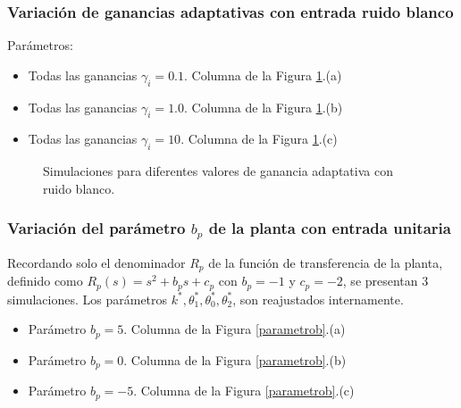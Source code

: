 \documentclass[letterpaper,11pt]{article} %
\begin{document}
\subsubsection{Variación de ganancias adaptativas con entrada ruido blanco}
Parámetros:
\begin{itemize}
	\item Todas las ganancias $\gamma_i = 0.1$. Columna de la Figura \ref{gananciasruido}.(a)
	\item Todas las ganancias $\gamma_i = 1.0$. Columna de la Figura \ref{gananciasruido}.(b)
	\item Todas las ganancias $\gamma_i = 10$. Columna de la Figura \ref{gananciasruido}.(c)
\end{itemize}
\newpage
\begin{figure}[h]
	\centering
	\captionsetup{justification=centering}
	\newline
	\noindent
	\newline
	\noindent
	\addtocounter{figure}{-1}  
	\caption{Simulaciones para diferentes valores de ganancia adaptativa con ruido blanco.}
	\label{gananciasruido}
\end{figure}
\subsubsection{Variación del parámetro $b_p$ de la planta con entrada unitaria}
Recordando solo el denominador $R_p$ de la función de transferencia de la planta, definido como $R_p(s) = s^2 + b_ps + c_p$ con $b_p=-1$ y $c_p = -2$, se presentan 3 simulaciones. Los parámetros $k^*, \theta_1^*, \theta_0^*, \theta_2^*$, son reajustados internamente.
\begin{itemize}
	\item Parámetro $b_p = 5$. Columna de la Figura \ref{parametrob}.(a)
	\item Parámetro $b_p = 0$. Columna de la Figura \ref{parametrob}.(b)
	\item Parámetro $b_p = -5$. Columna de la Figura \ref{parametrob}.(c)
\end{itemize}
\newpage
\end{document}
